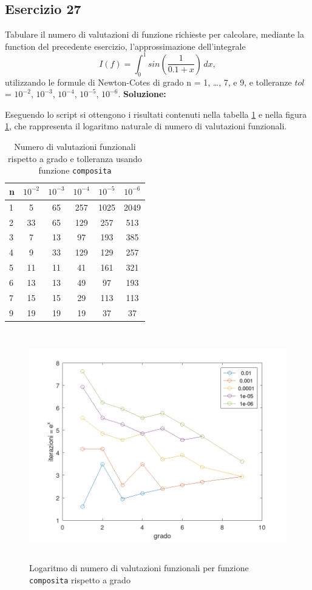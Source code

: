 \subsection{Esercizio 27}
Tabulare il numero di valutazioni di funzione richieste per calcolare, mediante la
function del precedente esercizio, l'approssimazione dell'integrale
\[
    I(f) = \int_{0}^{1} sin\left(\frac{1}{0.1+x}\right)\,dx,
\]
utilizzando le formule di Newton-Cotes di grado n = 1, \dots, 7, e 9,
e tolleranze $tol$ = $10^{-2}$, $10^{-3}$, $10^{-4}$, $10^{-5}$, $10^{-6}$.
\newline \textbf{Soluzione:}

Eseguendo lo script  si ottengono i risultati contenuti nella
tabella \ref{tab:27} e nella figura \ref{fig:es27}, che rappresenta il
logaritmo naturale di numero di valutazioni funzionali.
\begin{table}[ht]
    \centering
    \renewcommand\arraystretch{2}
    \begin{tabular}{| l | c c c c c |}
        \hline
        n & $10^{-2}$ & $10^{-3}$ & $10^{-4}$ & $10^{-5}$ & $10^{-6}$ \\
        \hline
        1 & 5         & 65        & 257       & 1025      & 2049      \\
        2 & 33        & 65        & 129       & 257       & 513       \\
        3 & 7         & 13        & 97        & 193       & 385       \\
        4 & 9         & 33        & 129       & 129       & 257       \\
        5 & 11        & 11        & 41        & 161       & 321       \\
        6 & 13        & 13        & 49        & 97        & 193       \\
        7 & 15        & 15        & 29        & 113       & 113       \\
        9 & 19        & 19        & 19        & 37        & 37        \\
        \hline
    \end{tabular}
    \caption{Numero di valutazioni funzionali rispetto a grado e tolleranza usando funzione \lstinline{composita}}
    \label{tab:27}
\end{table}
\FloatBarrier
\begin{figure}[!ht]
    \centering
    \includegraphics[width=16cm,height=10cm,keepaspectratio]{capitolo5/es27_figure.png}
    \caption{Logaritmo di numero di valutazioni funzionali per funzione \lstinline{composita} rispetto a grado}
    \label{fig:es27}
\end{figure}
\FloatBarrier
